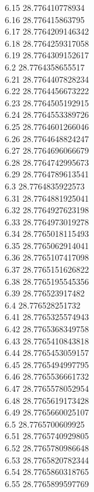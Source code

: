 {6.15	28.776410778934\\
6.16	28.776415863795\\
6.17	28.7764209146342\\
6.18	28.7764259317058\\
6.19	28.7764309152617\\
6.2	28.7764358655517\\
6.21	28.7764407828234\\
6.22	28.7764456673222\\
6.23	28.7764505192915\\
6.24	28.7764553389726\\
6.25	28.7764601266046\\
6.26	28.7764648824247\\
6.27	28.7764696066679\\
6.28	28.7764742995673\\
6.29	28.7764789613541\\
6.3	28.7764835922573\\
6.31	28.7764881925041\\
6.32	28.7764927623198\\
6.33	28.7764973019278\\
6.34	28.7765018115493\\
6.35	28.7765062914041\\
6.36	28.7765107417098\\
6.37	28.7765151626822\\
6.38	28.7765195545356\\
6.39	28.776523917482\\
6.4	28.776528251732\\
6.41	28.7765325574943\\
6.42	28.7765368349758\\
6.43	28.7765410843818\\
6.44	28.7765453059157\\
6.45	28.7765494997795\\
6.46	28.7765536661732\\
6.47	28.7765578052954\\
6.48	28.7765619173428\\
6.49	28.7765660025107\\
6.5	28.7765700609925\\
6.51	28.7765740929805\\
6.52	28.7765780986648\\
6.53	28.7765820782344\\
6.54	28.7765860318765\\
6.55	28.7765899597769\\
}
